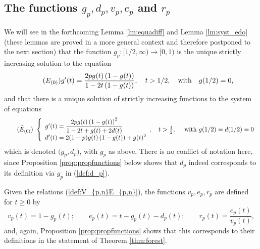 \documentclass[a4, 11pt]{article}
\numberwithin{equation}{section}
\theoremstyle{plain}
\theoremstyle{definition}
\theoremstyle{remark}
\begin{document}
\subsection{The functions $g_p,d_p,v_p,e_p$ and $r_p$}
\label{sub:functions}

We will see in the forthcoming Lemma \ref{lm:equadiff} and Lemma \ref{lm:syst_edo} (these lemmas are proved in a more general context and therefore postponed to the next section) that the function $g_p:[1/2,\infty)\rightarrow [0,1)$ is the unique strictly increasing solution to the equation 
\begin{equation}
\tag{$E_{(0)}$}
\label{eq:f}
	g'(t)=\frac{2pg(t)\left(1-g(t)\right)}{1-2t \left(1-g(t)\right)}, \quad t> 1/2, \quad \text{with} \quad g(1/2)=0,
\end{equation}
and that there is a unique solution of strictly increasing functions to the system of equations
\begin{equation}
\tag{$\tilde E_{(0)}$}
\label{eq:syst_EDO_0}
\begin{array}{l}	
	\left\{
	\begin{array}{ll}
		g'(t)=\displaystyle \frac{2pg(t)\left(1-g(t)\right)^2}{1-2t+g(t)+2d(t)} \\
		d'(t)=2(1-p)g(t)\left(1-g(t)\right)+g(t)^2
	\end{array},
	\quad t>\frac{1}{2}, \quad  \text{ with } g(1/2)=d(1/2)=0
	\right.
	\end{array}
\end{equation}
which is denoted $\big(g_p,d_p\big)$, with $g_p$ as above. There is no conflict of notation here, since Proposition \ref{prop:propfunctions} below shows that $d_p$ indeed corresponds to its definition via $g_p$ in (\ref{def:d_p}).

Given the relations (\ref{def:V_{p,n}E_{p,n}}), the functions $v_p,e_p, r_p$ are defined for $t \geq 0$ by
$$
v_p(t)=1-g_p(t); \quad  \quad e_p(t)=t-g_p(t)-d_p(t); \quad  \quad  r_p(t)=\frac{e_p(t)}{v_p(t)},
$$
and, again, Proposition \ref{prop:propfunctions} shows that this corresponds to their definitions in the statement of Theorem \ref{thm:forest}.
\end{document}
